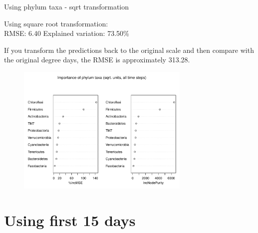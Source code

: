 \documentclass{beamer}
\begin{document}
\begin{frame}{Using phylum taxa - sqrt transformation}

  {\scriptsize
    
  \noindent Using square root transformation:\\
  RMSE: 6.40  \hspace{0.05in}  Explained variation: 73.50\%

  \vspace{0.05in}
  
  \noindent If you transform the predictions back to the original
  scale and then compare with the original degree days, the RMSE is
  approximately 313.28.
  
\begin{center}
\begin{figure}
  \includegraphics[width=3.25in]{../only_phyla/all_time_steps/sqrt_units_all_data_phyla_imp_plot}
\end{figure}
\end{center}
\vspace{-0.25in}
}
  
\end{frame}




\section[First 15 days]{Using first 15 days}
\end{document}
